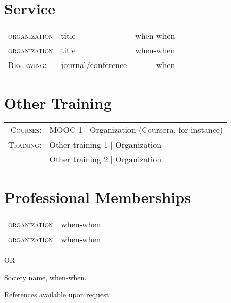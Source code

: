 \documentclass[a4paper,11pt]{article}
\begin{document}
\section{Service}
\begin{tabular}{llr}
	 \textsc{organization}& title & when-when\\
	 \textsc{organization}& title & when-when\\
	 \textsc{Reviewing:}
	  &journal/conference & when\\
\end{tabular}


\section{Other Training}
\begin{tabular}{rl}
  \textsc{Courses:}
  &MOOC 1 | Organization (Coursera, for instance)\\
  \textsc{Training:}
  &Other training 1 | Organization\\
  &Other training 2 | Organization
\end{tabular}

\section{Professional Memberships}
\begin{tabular}{lr}
	\textsc{organization} & when-when\\
	\textsc{organization} & when-when\\
\end{tabular}

OR

\begin{enumerate}[noitemsep, leftmargin=*,label={[\arabic*]}]
\item{Society name, when-when.}
\end{enumerate}

References available upon request.
\end{document}
